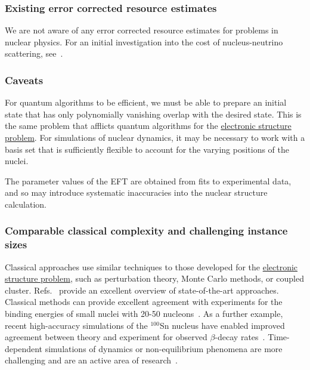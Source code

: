 \begin{refsection}

\subsubsection*{Existing error corrected resource estimates}
We are not aware of any error corrected resource estimates for problems in nuclear physics. For an initial investigation into the cost of nucleus-neutrino scattering, see~\cite{roggero2020NeutrinoNucleus}.


\subsubsection*{Caveats}
For quantum algorithms to be efficient, we must be able to prepare an initial state that has only polynomially vanishing overlap with the desired state. This is the same problem that afflicts quantum algorithms for the \hyperref[appl:ElectronicStructure]{electronic structure problem}. For simulations of nuclear dynamics, it may be necessary to work with a basis set that is sufficiently flexible to account for the varying positions of the nuclei.

The parameter values of the EFT are obtained from fits to experimental data, and so may introduce systematic inaccuracies into the nuclear structure calculation.



\subsubsection*{Comparable classical complexity and challenging instance sizes}
Classical approaches use similar techniques to those developed for the \hyperref[appl:ElectronicStructure]{electronic structure problem}, such as perturbation theory, Monte Carlo methods, or coupled cluster. Refs.~\cite{hagen2014CoupledClusterNuclear, hergert2020AbInitioNuclear} provide an excellent overview of state-of-the-art approaches. Classical methods can provide excellent agreement with experiments for the binding energies of small nuclei with 20-50 nucleons~\cite{hergert2020AbInitioNuclear}. As a further example, recent high-accuracy simulations of the $^{100}$Sn nucleus have enabled improved agreement between theory and experiment for observed $\beta$-decay rates~\cite{Gysbers2019BetaDecayFirstPrinciples}. Time-dependent simulations of dynamics or non-equilibrium phenomena are more challenging and are an active area of research~\cite{bender2020NuclearFission,navratil2022NuclearReaction}. 



\end{refsection}
